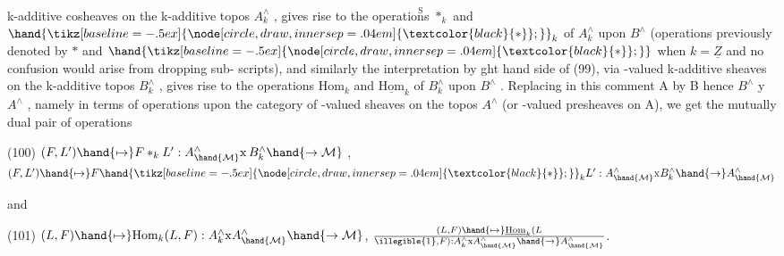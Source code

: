 
k\textsuperscript{}-additive cosheaves on the k-additive topos $A^{\wedge}_{k}$ , gives rise to the
operatio\(\overset{\text{S}}{\text{n}}\)s $*_{k}$ and $\hand{\mathbin{\tikz[baseline=-.5ex]{\node[circle,draw,inner sep=.04em] {\ensuremath{\textcolor{black}{*}}};}}}_{k}$ of $A^{\wedge}_{k}$ upon $B^{\wedge}$ (operations previously denoted
by $*$ and $\hand{\mathbin{\tikz[baseline=-.5ex]{\node[circle,draw,inner sep=.04em] {\ensuremath{\textcolor{black}{*}}};}}}$ when $k=\underline{Z}$ and no confusion would arise from dropping sub-%
scripts), and similarly the interpretation by ght hand side of (99),
via -valued  k-additive sheaves on the k-additive topos $B^{\wedge}_{k}$ ,
gives rise to the operations $\mathrm{Hom}_{k}$ and $\underline{\mathrm{Hom}}_{k}$ of $B^{\wedge}_{k}$ upon $B^{\wedge}$ . Replacing
in this comment A by B hence $B^{\wedge}$ y $A^{\wedge}$ , namely in terms of operations upon
the category of -valued sheaves on the topos $A^{\wedge}$ (or -valued presheaves
on A), we get the mutually dual pair of operations


(100) \quad $(F,L')\hand{\mapsto} F*_{k}L' : A^{\wedge}_{\hand{\mathcal{M}}}\mathrm{x}\, B^{\wedge}_{k}\hand{\to\mathcal{M}}$ \quad , \quad $(F,L')\hand{\mapsto} F\hand{\mathbin{\tikz[baseline=-.5ex]{\node[circle,draw,inner sep=.04em] {\ensuremath{\textcolor{black}{*}}};}}}_{k}L' : A^{\wedge}_{\hand{\mathcal{M}}}\mathrm{x}B^{\wedge}_{k}\hand{\to} A^{\wedge}_{\hand{\mathcal{M}}}$

and

(101) \quad $(L,F)\hand{\mapsto}\mathrm{Hom}_{k}(L,F) : A^{\wedge}_{k}\mathrm{x}A^{\wedge}_{\hand{\mathcal{M}}}\hand{\to\mathcal{M}}$, \quad $(L,F)\hand{\mapsto}\underline{\mathrm{Hom}}_{k}(L\over{\illegible{1}}{,}F) : A^{\wedge}_{k}\mathrm{x}A^{\wedge}_{\hand{\mathcal{M}}}\hand{\to}A^{\wedge}_{\hand{\mathcal{M}}}$.

